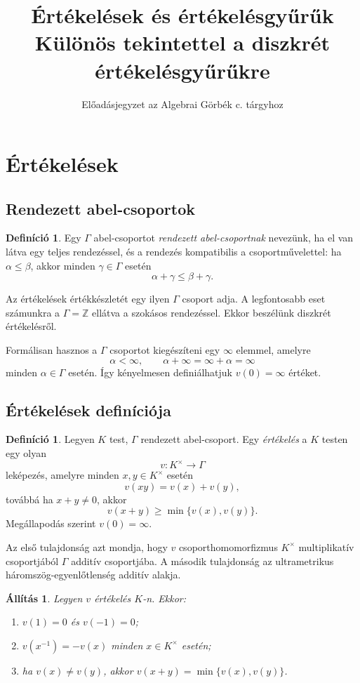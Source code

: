 \documentclass[11pt,a4paper]{article}
\title{Értékelések és értékelésgyűrűk\\
\large Különös tekintettel a diszkrét értékelésgyűrűkre}
\author{Előadásjegyzet az Algebrai Görbék c. tárgyhoz}
\date{}
\newtheorem{allitas}[tetel]{Állítás}
\theoremstyle{definition}
\newtheorem{definicio}[tetel]{Definíció}
\newcommand{\ZZ}{\mathbb Z}
\begin{document}
\maketitle
\tableofcontents

\section{Értékelések}

\subsection{Rendezett abel-csoportok}

\begin{definicio}
Egy $\Gamma$ abel-csoportot \emph{rendezett abel-csoportnak} nevezünk,
ha el van látva egy teljes rendezéssel, és a rendezés kompatibilis a
csoportművelettel: ha $\alpha\leq \beta$, akkor minden
$\gamma\in\Gamma$ esetén
\[
  \alpha+\gamma\leq \beta+\gamma.
\]
\end{definicio}

Az értékelések értékkészletét egy ilyen $\Gamma$ csoport
adja. A legfontosabb eset számunkra a $\Gamma=\ZZ$ ellátva a szokásos
rendezéssel. Ekkor beszélünk diszkrét értékelésről.

Formálisan hasznos a $\Gamma$ csoportot kiegészíteni egy $\infty$
elemmel, amelyre
\[
  \alpha < \infty,\qquad
  \alpha+\infty=\infty+\alpha=\infty
\]
minden $\alpha\in\Gamma$ esetén. Így kényelmesen definiálhatjuk
$v(0)=\infty$ értéket.

\subsection{Értékelések definíciója}

\begin{definicio}
\label{def:ertekeles}
Legyen $K$ test, $\Gamma$ rendezett abel-csoport. Egy
\emph{értékelés} a $K$ testen egy olyan
\[
  v:K^\times\longrightarrow \Gamma
\]
leképezés, amelyre minden $x,y\in K^\times$ esetén
\[
  v(xy)=v(x)+v(y),
\]
továbbá ha $x+y\neq 0$, akkor
\[
  v(x+y)\geq \min\{v(x),v(y)\}.
\]
Megállapodás szerint $v(0)=\infty$.
\end{definicio}

Az első tulajdonság azt mondja, hogy $v$ csoporthomomorfizmus
$K^\times$ multiplikatív csoportjából $\Gamma$ additív csoportjába. A
második tulajdonság az ultrametrikus háromszög-egyenlőtlenség
additív alakja.

\begin{allitas}
Legyen $v$ értékelés $K$-n. Ekkor:
\begin{enumerate}
  \item $v(1)=0$ és $v(-1)=0$;
  \item $v(x^{-1})=-v(x)$ minden $x\in K^\times$ esetén;
  \item ha $v(x)\neq v(y)$, akkor $v(x+y)=\min\{v(x),v(y)\}$.
\end{enumerate}
\end{allitas}
\end{document}

